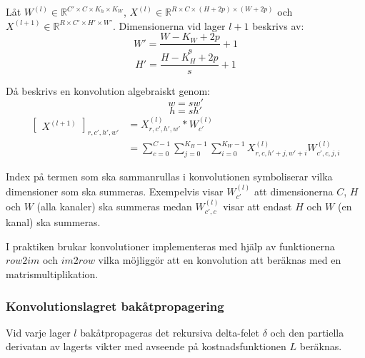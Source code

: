 \documentclass[a4paper,11pt,twoside]{article}
\begin{document}
Låt $W^{(l)} \in \mathbb{R}^{C' \times C  \times K_h \times K_W}$, $X^{(l)} \in \mathbb{R}^{R \times C  \times (H+2p) \times (W+2p)}$ och $X^{(l+1)} \in \mathbb{R}^{R \times C'  \times H' \times W'}$. Dimensionerna vid lager $l+1$ beskrivs av: \cite{cs231n} \cite{convmath} \cite{convarithmetic}
\begin{equation}
W' = \frac{W-K_W+2p}{s} +1
\end{equation}
\begin{equation}
H' = \frac{H-K_H+2p}{s} +1
\end{equation}

Då beskrivs en konvolution algebraiskt genom: \cite{cs231n} \cite{convmath}
\begin{equation}
w = sw'
\end{equation}
\begin{equation}
h = sh'
\end{equation}
\begin{equation}\label{konvolution}
\begin{split}
	\begin{bmatrix} X^{(l+1)} \end{bmatrix}_{r, c', h', w'}	
		& = X^{(l)}_{r, c', h', w'} *W^{(l)}_{c'} \\
		& = \sum^{C-1}_{c=0} \sum^{K_H-1}_{j=0} \sum^{K_W-1}_{i=0} X^{(l)}_{r, c, h'+j, w'+i}W^{(l)}_{c', c, j, i}
\end{split}
\end{equation}

Index på termen som ska sammanrullas i konvolutionen symboliserar vilka dimensioner som ska summeras. Exempelvis visar $W^{(l)}_{c'}$ att dimensionerna $C$, $H$ och $W$ (alla kanaler) ska summeras medan  $W^{(l)}_{c', c}$ visar att endast $H$ och $W$ (en kanal) ska summeras.

I praktiken brukar konvolutioner implementeras med hjälp av funktionerna $row2im$ och $im2row$ vilka möjliggör att en konvolution att beräknas med en matrismultiplikation. \cite{cs231n} \cite{convmath} \cite{convarithmetic}

\subsubsection{Konvolutionslagret bakåtpropagering}
Vid varje lager $l$ bakåtpropageras det rekursiva delta-felet $\delta$ och den partiella derivatan av lagerts vikter med avseende på kostnadsfunktionen $L$ beräknas. 
\end{document}

